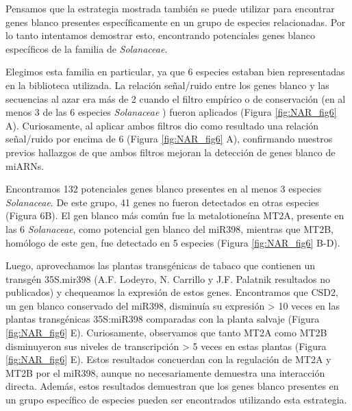 Pensamos que la estrategia mostrada también se puede utilizar para encontrar genes blanco presentes específicamente en un grupo de especies relacionadas.
Por lo tanto intentamos demostrar esto, encontrando potenciales genes blanco específicos de la familia de \textit{Solanaceae}. 

Elegimos esta familia en particular, ya que 6 especies estaban bien representadas en la biblioteca utilizada.
La relación señal/ruido entre los genes blanco y las secuencias al azar era más de 2 cuando el filtro empírico o de conservación (en al menos 3 de las 6 especies \textit{Solanaceae} ) fueron aplicados (Figura \ref{fig:NAR_fig6} A).
Curiosamente, al aplicar ambos filtros dio como resultado una relación señal/ruido por encima de 6 (Figura \ref{fig:NAR_fig6} A), confirmando nuestros previos hallazgos de que ambos filtros mejoran la detección de genes blanco de miARNs.

Encontramos 132 potenciales genes blanco presentes en al menos 3 especies \textit{Solanaceae}. De este grupo, 41 genes no fueron detectados en otras especies (Figura 6B).
El gen blanco más común fue la metalotioneína MT2A, presente en las 6 \textit{Solanaceae}, como potencial gen blanco del miR398, mientras que MT2B, homólogo de este gen, fue detectado en 5 especies (Figura \ref{fig:NAR_fig6} B-D).

Luego, aprovechamos las plantas transgénicas de tabaco que contienen un transgén 35S.mir398 (A.F. Lodeyro, N. Carrillo y J.F. Palatnik resultados no publicados) y chequeamos la expresión de estos genes.
Encontramos que CSD2, un gen blanco conservado del miR398, disminuía su expresión > 10 veces en las plantas transgénicas 35S:miR398 comparadas con la planta salvaje (Figura \ref{fig:NAR_fig6} E).
Curiosamente, observamos que tanto MT2A como MT2B  disminuyeron sus niveles de transcripción > 5 veces en estas plantas (Figura \ref{fig:NAR_fig6} E).
Estos resultados concuerdan con la regulación de MT2A y MT2B por el miR398, aunque no necesariamente demuestra una interacción directa.
Además, estos resultados demuestran que los genes blanco presentes en un grupo específico de especies pueden ser encontrados utilizando esta estrategia.


